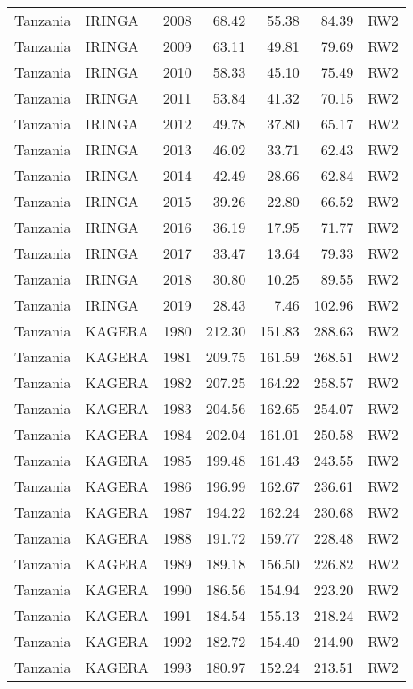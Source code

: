 \begin{longtable}{lllrrrl}
  Tanzania & IRINGA & 2008 & 68.42 & 55.38 & 84.39 & RW2 \\ 
  Tanzania & IRINGA & 2009 & 63.11 & 49.81 & 79.69 & RW2 \\ 
  Tanzania & IRINGA & 2010 & 58.33 & 45.10 & 75.49 & RW2 \\ 
  Tanzania & IRINGA & 2011 & 53.84 & 41.32 & 70.15 & RW2 \\ 
  Tanzania & IRINGA & 2012 & 49.78 & 37.80 & 65.17 & RW2 \\ 
  Tanzania & IRINGA & 2013 & 46.02 & 33.71 & 62.43 & RW2 \\ 
  Tanzania & IRINGA & 2014 & 42.49 & 28.66 & 62.84 & RW2 \\ 
  Tanzania & IRINGA & 2015 & 39.26 & 22.80 & 66.52 & RW2 \\ 
  Tanzania & IRINGA & 2016 & 36.19 & 17.95 & 71.77 & RW2 \\ 
  Tanzania & IRINGA & 2017 & 33.47 & 13.64 & 79.33 & RW2 \\ 
  Tanzania & IRINGA & 2018 & 30.80 & 10.25 & 89.55 & RW2 \\ 
  Tanzania & IRINGA & 2019 & 28.43 & 7.46 & 102.96 & RW2 \\ 
  Tanzania & KAGERA & 1980 & 212.30 & 151.83 & 288.63 & RW2 \\ 
  Tanzania & KAGERA & 1981 & 209.75 & 161.59 & 268.51 & RW2 \\ 
  Tanzania & KAGERA & 1982 & 207.25 & 164.22 & 258.57 & RW2 \\ 
  Tanzania & KAGERA & 1983 & 204.56 & 162.65 & 254.07 & RW2 \\ 
  Tanzania & KAGERA & 1984 & 202.04 & 161.01 & 250.58 & RW2 \\ 
  Tanzania & KAGERA & 1985 & 199.48 & 161.43 & 243.55 & RW2 \\ 
  Tanzania & KAGERA & 1986 & 196.99 & 162.67 & 236.61 & RW2 \\ 
  Tanzania & KAGERA & 1987 & 194.22 & 162.24 & 230.68 & RW2 \\ 
  Tanzania & KAGERA & 1988 & 191.72 & 159.77 & 228.48 & RW2 \\ 
  Tanzania & KAGERA & 1989 & 189.18 & 156.50 & 226.82 & RW2 \\ 
  Tanzania & KAGERA & 1990 & 186.56 & 154.94 & 223.20 & RW2 \\ 
  Tanzania & KAGERA & 1991 & 184.54 & 155.13 & 218.24 & RW2 \\ 
  Tanzania & KAGERA & 1992 & 182.72 & 154.40 & 214.90 & RW2 \\ 
  Tanzania & KAGERA & 1993 & 180.97 & 152.24 & 213.51 & RW2 \\ 

\end{longtable}
